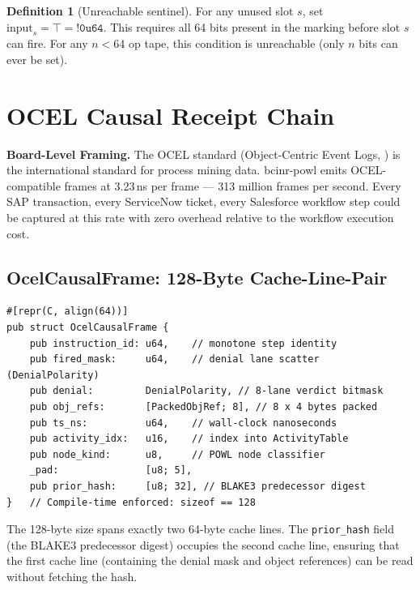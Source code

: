 \documentclass[12pt,a4paper]{article}
\theoremstyle{definition}
\newtheorem{definition}[theorem]{Definition}
\theoremstyle{remark}
\newcommand{\execinsight}[2]{%
  \begin{execbox}
    \textbf{\color{chatblue}#1}\quad #2
  \end{execbox}}
\begin{document}
\begin{definition}[Unreachable sentinel]
For any unused slot $s$, set $\mathrm{input}_s = \top = \mathtt{!0u64}$.
This requires all 64 bits present in the marking before slot $s$ can fire.
For any $n < 64$ op tape, this condition is unreachable (only $n$ bits can ever be set).
\end{definition}

\section{OCEL Causal Receipt Chain}
\label{sec:ocel}

\execinsight{Board-Level Framing.}{%
The OCEL standard (Object-Centric Event Logs, \citealt{ocel2023}) is the international
standard for process mining data.
bcinr-powl emits OCEL-compatible frames at 3.23\,ns per frame ---
313 million frames per second.
Every SAP transaction, every ServiceNow ticket, every Salesforce workflow step
could be captured at this rate with zero overhead relative to the workflow execution cost.}

\subsection{OcelCausalFrame: 128-Byte Cache-Line-Pair}

\begin{lstlisting}[caption={OcelCausalFrame --- two 64-byte cache lines, 128 bytes total}]
#[repr(C, align(64))]
pub struct OcelCausalFrame {
    pub instruction_id: u64,    // monotone step identity
    pub fired_mask:     u64,    // denial lane scatter (DenialPolarity)
    pub denial:         DenialPolarity, // 8-lane verdict bitmask
    pub obj_refs:       [PackedObjRef; 8], // 8 x 4 bytes packed
    pub ts_ns:          u64,    // wall-clock nanoseconds
    pub activity_idx:   u16,    // index into ActivityTable
    pub node_kind:      u8,     // POWL node classifier
    _pad:               [u8; 5],
    pub prior_hash:     [u8; 32], // BLAKE3 predecessor digest
}   // Compile-time enforced: sizeof == 128
\end{lstlisting}

The 128-byte size spans exactly two 64-byte cache lines.
The \texttt{prior\_hash} field (the BLAKE3 predecessor digest) occupies the second cache line,
ensuring that the first cache line (containing the denial mask and object references)
can be read without fetching the hash.
\end{document}
